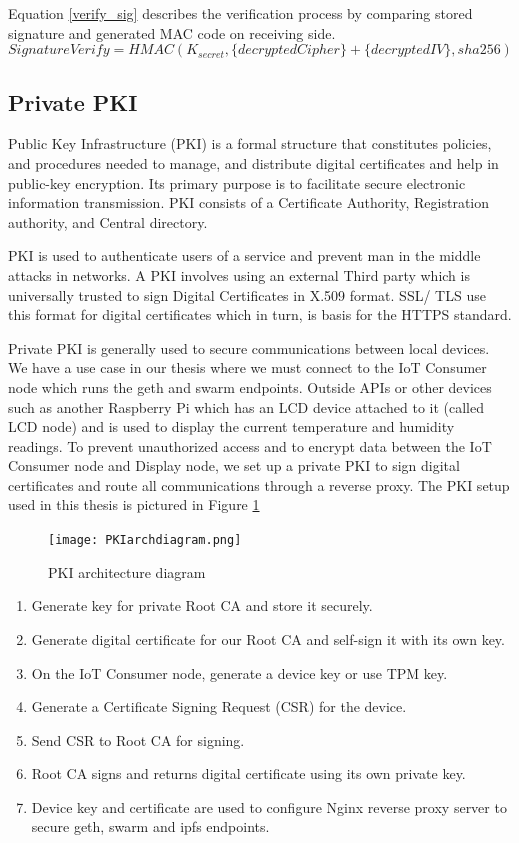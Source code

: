 \documentclass[11pt,openright]{report}
\begin{document}
Equation \ref{verify_sig} describes the verification process by comparing stored signature and generated MAC code on receiving side.
\begin{equation}\label{verify_sig}
    SignatureVerify 
    = HMAC(K_{secret}, \{decryptedCipher\} + \{decryptedIV\}, sha256)
\end{equation}


\subsection{Private PKI} \label{priv_pki}
Public Key Infrastructure (PKI) is a formal structure that constitutes policies, and procedures needed to manage, and distribute digital certificates and help in public-key encryption. Its primary purpose is to facilitate secure electronic information transmission. PKI consists of a Certificate Authority, Registration authority, and Central directory.

PKI is used to authenticate users of a service and prevent man in the middle attacks in networks. A PKI involves using an external Third party which is universally trusted to sign Digital Certificates in X.509 format. SSL/ TLS use this format for digital certificates which in turn, is basis for the HTTPS standard.

Private PKI is generally used to secure communications between local devices. We have a use case in our thesis where we must connect to the IoT Consumer node which runs the geth and swarm endpoints. Outside APIs or other devices such as another Raspberry Pi which has an LCD device attached to it (called LCD node) and is used to display the current temperature and humidity readings. To prevent unauthorized access and to encrypt data between the IoT Consumer node and Display node, we set up a private PKI to sign digital certificates and route all communications through a reverse proxy. The PKI setup used in this thesis is pictured in Figure \ref{fig:pkiarch}

\begin{figure}
	\centering
	\texttt{[image: PKIarchdiagram.png]}
	\caption{PKI architecture diagram}
	\label{fig:pkiarch}
\end{figure}


\begin{enumerate}
	\item Generate key for private Root CA and store it securely.
	\item Generate digital certificate for our Root CA and self-sign it with its own key.
	\item On the IoT Consumer node, generate a device key or use TPM key.
	\item Generate a Certificate Signing Request (CSR) for the device.
	\item Send CSR to Root CA for signing.
	\item Root CA signs and returns digital certificate using its own private key.
	\item Device key and certificate are used to configure Nginx reverse proxy server to secure geth, swarm and ipfs endpoints.
\end{enumerate}
\end{document}
